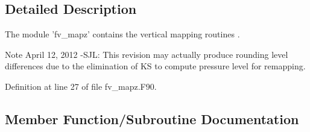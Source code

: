 \subsection{Detailed Description}
The module 'fv\-\_\-mapz' contains the vertical mapping routines \cite{lin2004vertically}. 

\begin{DoxyNote}{Note}
April 12, 2012 -\/\-S\-J\-L\-: This revision may actually produce rounding level differences due to the elimination of K\-S to compute pressure level for remapping. 
\end{DoxyNote}


Definition at line 27 of file fv\-\_\-mapz.\-F90.



\subsection{Member Function/\-Subroutine Documentation}

